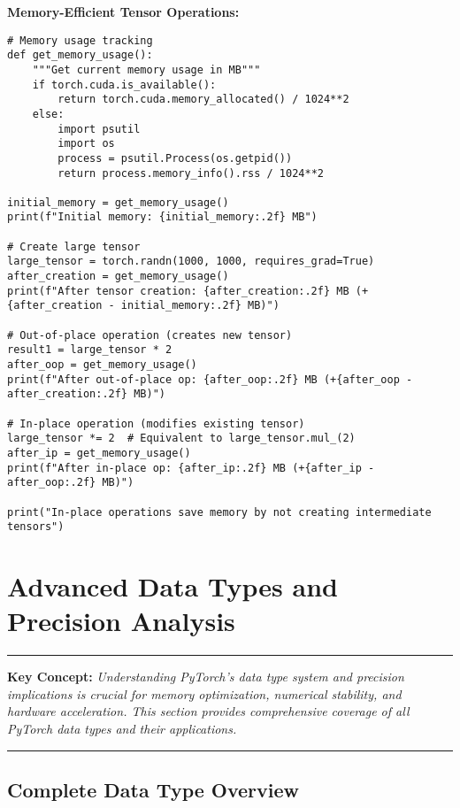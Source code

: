 \documentclass[11pt,a4paper]{book}
\newenvironment{keybox}
{\begin{center}
\begin{minipage}{0.9\textwidth}
\vspace{0.3em}
\hrule height 0.8pt
\vspace{0.5em}
\textbf{Key Concept:} \itshape}
{\vspace{0.5em}
\hrule height 0.8pt
\vspace{0.3em}
\end{minipage}
\end{center}}
\begin{document}
\textbf{Memory-Efficient Tensor Operations:}
\begin{verbatim}
# Memory usage tracking
def get_memory_usage():
    """Get current memory usage in MB"""
    if torch.cuda.is_available():
        return torch.cuda.memory_allocated() / 1024**2
    else:
        import psutil
        import os
        process = psutil.Process(os.getpid())
        return process.memory_info().rss / 1024**2

initial_memory = get_memory_usage()
print(f"Initial memory: {initial_memory:.2f} MB")

# Create large tensor
large_tensor = torch.randn(1000, 1000, requires_grad=True)
after_creation = get_memory_usage()
print(f"After tensor creation: {after_creation:.2f} MB (+{after_creation - initial_memory:.2f} MB)")

# Out-of-place operation (creates new tensor)
result1 = large_tensor * 2
after_oop = get_memory_usage()
print(f"After out-of-place op: {after_oop:.2f} MB (+{after_oop - after_creation:.2f} MB)")

# In-place operation (modifies existing tensor)
large_tensor *= 2  # Equivalent to large_tensor.mul_(2)
after_ip = get_memory_usage()
print(f"After in-place op: {after_ip:.2f} MB (+{after_ip - after_oop:.2f} MB)")

print("In-place operations save memory by not creating intermediate tensors")
\end{verbatim}

\section{Advanced Data Types and Precision Analysis}

\begin{keybox}
Understanding PyTorch's data type system and precision implications is crucial for memory optimization, numerical stability, and hardware acceleration. This section provides comprehensive coverage of all PyTorch data types and their applications.
\end{keybox}

\subsection{Complete Data Type Overview}
\end{document}
